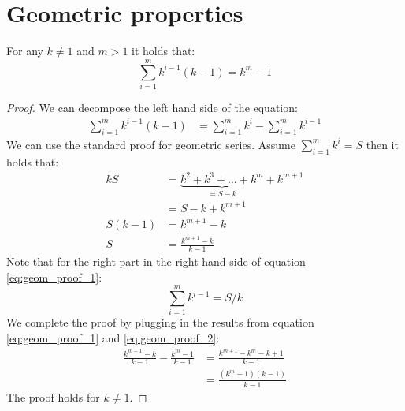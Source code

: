 \section{Geometric properties}

\begin{prop}
For any $k \neq 1$ and $m > 1 $ it holds that:
\begin{equation}
\sum_{i = 1}^{m} k^{i-1}(k - 1) = k^m -1
\end{equation}
\end{prop}
\begin{proof}
We can decompose the left hand side of the equation:
\begin{equation}
\label{eq:geom_proof_1}
\begin{split}
\sum_{i = 1}^{m} k^{i-1}(k - 1)
	&= \sum_{i = 1}^{m}k^i - \sum_{i = 1}^{m} k^{i-1}
\end{split}\end{equation}
We can use the standard proof for geometric series. Assume
$\sum_{i = 1}^{m}k^i = S$ then it holds that:
\begin{equation}\label{eq:geom_proof_2}\begin{split}
kS 
	&= \underbrace{k^2 + k^3 + \dots + k^m}_{= S - k} + k^{m+1} \\
	&= S - k + k^{m+1}\\
S(k-1) 
	&= 	k^{m+1} - k \\
S 
	&= \frac{k^{m+1} - k}{k - 1}
\end{split}\end{equation}
Note that for the right part in the right hand side of equation
\ref{eq:geom_proof_1}:
\begin{equation}
\sum_{i=1}^{m} k^{i-1} = S/k
\end{equation}
We complete the proof by plugging in the results from equation
\ref{eq:geom_proof_1} and \ref{eq:geom_proof_2}:
\begin{equation}\begin{split}
\frac{k^{m+1} - k}{k - 1} - \frac{k^m - 1}{k - 1} 
	&= \frac{k^{m+1} - k^m - k + 1}{k - 1}\\
	&= \frac{(k^m -1)(k-1)}{k -1}
\end{split}\end{equation}
The proof holds for $k \neq 1$.
\end{proof}